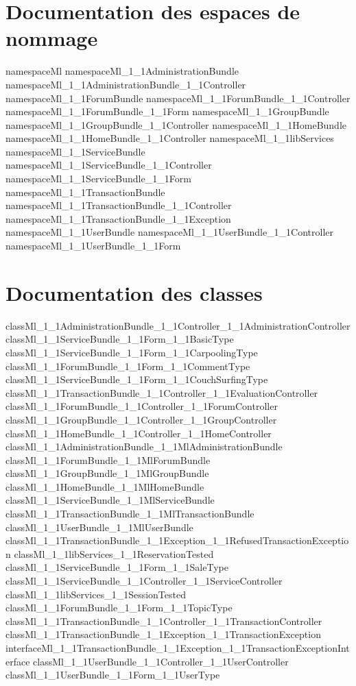 \chapter{Documentation des espaces de nommage}
{namespaceMl}
{namespaceMl_1_1AdministrationBundle}
{namespaceMl_1_1AdministrationBundle_1_1Controller}
{namespaceMl_1_1ForumBundle}
{namespaceMl_1_1ForumBundle_1_1Controller}
{namespaceMl_1_1ForumBundle_1_1Form}
{namespaceMl_1_1GroupBundle}
{namespaceMl_1_1GroupBundle_1_1Controller}
{namespaceMl_1_1HomeBundle}
{namespaceMl_1_1HomeBundle_1_1Controller}
{namespaceMl_1_1libServices}
{namespaceMl_1_1ServiceBundle}
{namespaceMl_1_1ServiceBundle_1_1Controller}
{namespaceMl_1_1ServiceBundle_1_1Form}
{namespaceMl_1_1TransactionBundle}
{namespaceMl_1_1TransactionBundle_1_1Controller}
{namespaceMl_1_1TransactionBundle_1_1Exception}
{namespaceMl_1_1UserBundle}
{namespaceMl_1_1UserBundle_1_1Controller}
{namespaceMl_1_1UserBundle_1_1Form}
\chapter{Documentation des classes}
{classMl_1_1AdministrationBundle_1_1Controller_1_1AdministrationController}
{classMl_1_1ServiceBundle_1_1Form_1_1BasicType}
{classMl_1_1ServiceBundle_1_1Form_1_1CarpoolingType}
{classMl_1_1ForumBundle_1_1Form_1_1CommentType}
{classMl_1_1ServiceBundle_1_1Form_1_1CouchSurfingType}
{classMl_1_1TransactionBundle_1_1Controller_1_1EvaluationController}
{classMl_1_1ForumBundle_1_1Controller_1_1ForumController}
{classMl_1_1GroupBundle_1_1Controller_1_1GroupController}
{classMl_1_1HomeBundle_1_1Controller_1_1HomeController}
{classMl_1_1AdministrationBundle_1_1MlAdministrationBundle}
{classMl_1_1ForumBundle_1_1MlForumBundle}
{classMl_1_1GroupBundle_1_1MlGroupBundle}
{classMl_1_1HomeBundle_1_1MlHomeBundle}
{classMl_1_1ServiceBundle_1_1MlServiceBundle}
{classMl_1_1TransactionBundle_1_1MlTransactionBundle}
{classMl_1_1UserBundle_1_1MlUserBundle}
{classMl_1_1TransactionBundle_1_1Exception_1_1RefusedTransactionException}
{classMl_1_1libServices_1_1ReservationTested}
{classMl_1_1ServiceBundle_1_1Form_1_1SaleType}
{classMl_1_1ServiceBundle_1_1Controller_1_1ServiceController}
{classMl_1_1libServices_1_1SessionTested}
{classMl_1_1ForumBundle_1_1Form_1_1TopicType}
{classMl_1_1TransactionBundle_1_1Controller_1_1TransactionController}
{classMl_1_1TransactionBundle_1_1Exception_1_1TransactionException}
{interfaceMl_1_1TransactionBundle_1_1Exception_1_1TransactionExceptionInterface}
{classMl_1_1UserBundle_1_1Controller_1_1UserController}
{classMl_1_1UserBundle_1_1Form_1_1UserType}
